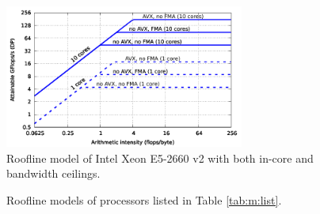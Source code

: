 \begin{figure}[t]
   \centering
   \includegraphics[width=0.7\textwidth,clip=true]{images/roofline/roofline_emmy_Xeon2660v2_all-ceilings.pdf}
   \caption{Roofline model of Intel Xeon E5-2660 v2 with both in-core and bandwidth ceilings.}
  \label{fig:roofline_emmy_all-ceilings}
\end{figure}

\begin{figure}%
  \centering%
  \caption{Roofline models of processors listed in Table \ref{tab:m:list}.}%
  \label{fig:rooflines}
\end{figure}

